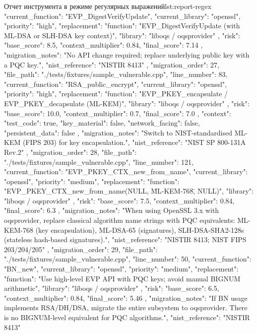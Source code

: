 \documentclass{itmo-vkr}
\begin{document}
\begin{itmolisting}[JSON]{Отчет инструмента в режиме регулярных выражений}{lst:report-regex}
{{			"current_function": "EVP_DigestVerifyUpdate",
			"current_library": "openssl",
			"priority": "high",
			"replacement": {
				"function": "EVP_DigestVerifyUpdate (with ML-DSA or SLH-DSA key context)",
				"library": "liboqs / oqsprovider"
			},
			"risk": {
				"base_score": 8.5,
				"context_multiplier": 0.84,
				"final_score": 7.14
			},
			"migration_notes": "No API change required; replace underlying public key with a PQC key.",
			"nist_reference": "NISTIR 8413"
		},
		{
			"migration_order": 27,
			"file_path": "./tests/fixtures/sample_vulnerable.cpp",
			"line_number": 83,
			"current_function": "RSA_public_encrypt",
			"current_library": "openssl",
			"priority": "high",
			"replacement": {
				"function": "EVP_PKEY_encapsulate / EVP_PKEY_decapsulate (ML-KEM)",
				"library": "liboqs / oqsprovider"
			},
			"risk": {
				"base_score": 10.0,
				"context_multiplier": 0.7,
				"final_score": 7.0
			},
			"context": {
				"test_code": true,
				"key_material": false,
				"network_facing": false,
				"persistent_data": false
			},
			"migration_notes": "Switch to NIST-standardised ML-KEM (FIPS 203) for key encapsulation.",
			"nist_reference": "NIST SP 800-131A Rev.2"
		},
		{
			"migration_order": 28,
			"file_path": "./tests/fixtures/sample_vulnerable.cpp",
			"line_number": 121,
			"current_function": "EVP_PKEY_CTX_new_from_name",
			"current_library": "openssl",
			"priority": "medium",
			"replacement": {
				"function": "EVP_PKEY_CTX_new_from_name(NULL, \"ML-KEM-768\", NULL)",
				"library": "liboqs / oqsprovider"
			},
			"risk": {
				"base_score": 7.5,
				"context_multiplier": 0.84,
				"final_score": 6.3
			},
			"migration_notes": "When using OpenSSL 3.x with oqsprovider, replace classical algorithm name strings with PQC equivalents: ML-KEM-768 (key encapsulation), ML-DSA-65 (signatures), SLH-DSA-SHA2-128s (stateless hash-based signatures).",
			"nist_reference": "NISTIR 8413; NIST FIPS 203/204/205"
		},
		{
			"migration_order": 29,
			"file_path": "./tests/fixtures/sample_vulnerable.cpp",
			"line_number": 50,
			"current_function": "BN_new",
			"current_library": "openssl",
			"priority": "medium",
			"replacement": {
				"function": "Use high-level EVP API with PQC keys; avoid manual BIGNUM arithmetic",
				"library": "liboqs / oqsprovider"
			},
			"risk": {
				"base_score": 6.5,
				"context_multiplier": 0.84,
				"final_score": 5.46
			},
			"migration_notes": "If BN usage implements RSA/DH/DSA, migrate the entire subsystem to oqsprovider. There is no BIGNUM-level equivalent for PQC algorithms.",
			"nist_reference": "NISTIR 8413"
}}
\end{itmolisting}
\end{document}
